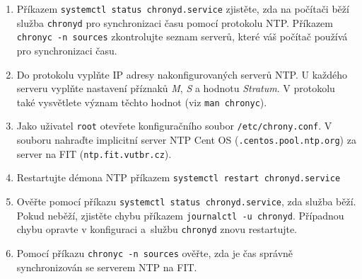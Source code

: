 \documentclass[a4paper,11pt]{article}
\begin{document}
\begin{enumerate}
  \item Příkazem {\tt systemctl status chronyd.service} zjistěte, zda na počítači běží služba \texttt{chronyd} pro synchronizaci času pomocí protokolu NTP. Příkazem {\tt chronyc -n sources} zkontrolujte seznam serverů, které váš počítač používá
    pro synchronizaci času.

  \item Do protokolu vyplňte IP adresy nakonfigurovaných serverů NTP. 
  U každého serveru vyplňte nastavení příznaků {\em M}, {\em S} a hodnotu {\em Stratum}.
  V protokolu také vysvětlete význam těchto hodnot (viz \texttt{man chronyc}).

  \item Jako uživatel \texttt{root} otevřete konfiguračního soubor {\tt /etc/chrony.conf}. V souboru
    nahraďte implicitní server NTP Cent OS ({\tt *.centos.pool.ntp.org}) za server na FIT ({\tt ntp.fit.vutbr.cz}). 
  \item Restartujte démona NTP příkazem {\tt systemctl restart chronyd.service}
  \item Ověřte pomocí příkazu {\tt systemctl status chronyd.service}, zda služba běží. Pokud neběží, zjistěte chybu příkazem {\tt journalctl -u chronyd}. Případnou chybu opravte v konfiguraci a~službu {\tt chronyd} znovu restartujte.
  \item Pomocí příkazu {\tt chronyc -n sources} ověřte, zda je čas správně synchronizován se serverem NTP na FIT.

\end{enumerate}
\end{document}

